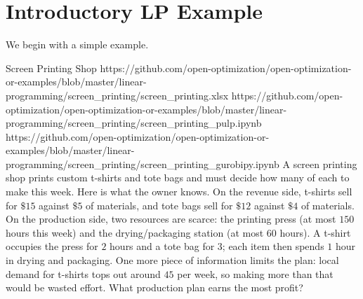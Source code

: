 \section{Introductory LP Example}
\label{sec:lp-intro-example}
We begin with a simple example.
\begin{examplewithallcode}{Screen Printing Shop}%
{https://github.com/open-optimization/open-optimization-or-examples/blob/master/linear-programming/screen_printing/screen_printing.xlsx}%
{https://github.com/open-optimization/open-optimization-or-examples/blob/master/linear-programming/screen_printing/screen_printing_pulp.ipynb}%
{https://github.com/open-optimization/open-optimization-or-examples/blob/master/linear-programming/screen_printing/screen_printing_gurobipy.ipynb}
%
A screen printing shop prints custom t-shirts and tote bags and must decide how many of each to make this week. Here is what the owner knows. On the revenue side, t-shirts sell for $\$15$ against $\$5$ of materials, and tote bags sell for $\$12$ against $\$4$ of materials. On the production side, two resources are scarce: the printing press (at most $150$ hours this week) and the drying/packaging station (at most $60$ hours). A t-shirt occupies the press for $2$ hours and a tote bag for $3$; each item then spends $1$ hour in drying and packaging. One more piece of information limits the plan: local demand for t-shirts tops out around $45$ per week, so making more than that would be wasted effort. What production plan earns the most profit?


\end{examplewithallcode}
